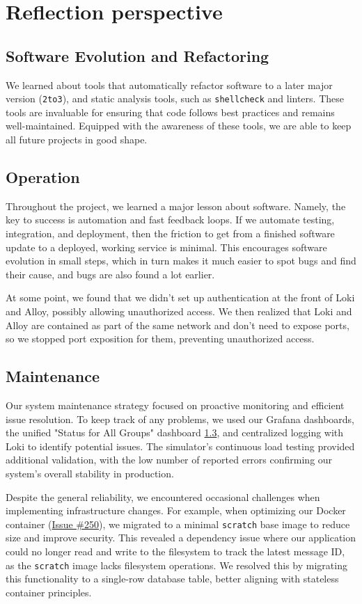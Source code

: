 \section{Reflection perspective} \label{rp}
\subsection{Software Evolution and Refactoring}
We learned about tools that automatically refactor software to a later major version (\texttt{2to3}),
and static analysis tools, such as \texttt{shellcheck} and linters. These tools are invaluable for
ensuring that code follows best practices and remains well-maintained. Equipped with the awareness
of these tools, we are able to keep all future projects in good shape. 


\subsection{Operation} %
Throughout the project, we learned a major lesson about software. Namely, the key to success is automation and fast feedback loops. If we automate testing, integration, and deployment, then the friction to get from a finished software update to a deployed, working service is minimal. This encourages software evolution in small steps, which in turn makes it much easier to spot bugs and find their cause, and bugs are also found a lot earlier.

At some point, we found that we didn’t set up authentication at the front of Loki
and Alloy, possibly allowing unauthorized access. We then realized 
that Loki and Alloy are contained as part of the same network and don’t need to expose ports,
so we stopped port exposition for them, preventing unauthorized access.

\subsection{Maintenance} 
Our system maintenance strategy focused on proactive monitoring and efficient issue resolution. To keep track of any problems, we used our Grafana dashboards, the unified "Status for All Groups" dashboard \ref{}, and centralized logging with Loki to identify potential issues. The simulator's continuous load testing provided additional validation, with the low number of reported errors confirming our system's overall stability in production.

Despite the general reliability, we encountered occasional challenges when implementing infrastructure changes. For example, when optimizing our Docker container (\href{https://github.com/devops-q/devops/issues/250}{Issue \#250}), we migrated to a minimal \texttt{scratch} base image to reduce size and improve security. This revealed a dependency issue where our application could no longer read and write to the filesystem to track the latest message ID, as the \texttt{scratch} image lacks filesystem operations. We resolved this by migrating this functionality to a single-row database table, better aligning with stateless container principles.

